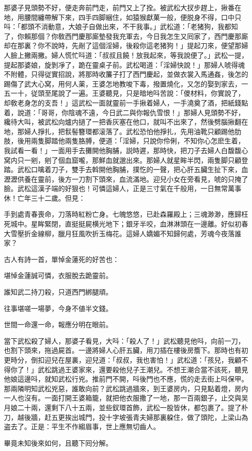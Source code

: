 那婆子見頭勢不好，便走奔前門走，前門又上了拴。被武松大扠步趕上，揪番在地，用腰間纏帶解下來，四手四脚綑住，如猿猴獻菓一般，便脱身不得，口中只呌：「都頭不消動意，大娘子自做出來，不干我事。」武松道：「老猪狗，我都知了，你賴那個？你敎西門慶那廝墊發我充軍去，今日我怎生又囘家了，西門慶那廝却在那裏？你不說時，先剮了這個淫婦，後殺你這老猪狗！」提起刀來，便望那婦人臉上撇兩撇。婦人慌忙呌道：「叔叔且饒！放我起來，等我說便了。」武松一提，提起那婆娘，旋剝凈了，跪在靈桌子前。武松喝道：「淫婦快說！」那婦人唬得魂不附體，只得従實招說，將那時收簾子打了西門慶起，並做衣裳入馬通姦，後怎的踢傷了武大心窝，用何人薬，王婆怎地教唆下毒，撥置燒化，又怎的娶到家去，一五一十，従頭至尾說了一遍。王婆聽見，只是暗地呌苦說：「儍材料，你實說了，却敎老身怎的支吾！」這武松一面就靈前一手揪着婦人，一手澆奠了酒，把紙錢點着，說道：「哥哥，你陰魂不遠，今日武二與你報仇雪恨！」那婦人見頭勢不好，纔待大叫，被武松向爐内撾了一把香灰塞在他口，就叫不出來了，然後劈腦揪翻在地，那婦人掙扎，把䯼髻簪環都滚落了。武松恐怕他掙扎，先用油靴只顧踢他肋肢，後用兩隻脚踏他兩隻胳膊，便道：「淫婦，只說你伶俐，不知你心怎麽生着，我試看一看！」一面用手去攤開他胸脯，説時遲，那時快，把刀子去婦人白馥馥心窝内只一剜，剜了個血窟嚨，那鮮血就邈出來。那婦人就星眸半閃，兩隻脚只顧登踏。武松口噙着刀子，雙手去斡開他胸脯，撲忔的一聲，把心肝五臟生扯下來，血瀝瀝供養在靈前，後方一刀割下頭來，血流滿地。迎兒小女在旁看見，唬的只掩了臉。武松這漢子端的好狠也！可憐這婦人，正是三寸氣在千般用，一日無常萬事休！亡年三十二歲。但見：

\begin{myquote}
手到處青春喪命，刀落時紅粉亡身。七魄悠悠，已赴森羅殿上；三魂渺渺，應歸枉死城中。星眸緊閉，直挺挺屍横光地下；銀牙半咬，血淋淋頭在一邊離。好似初春大雪壓折金線柳，臘月狂風吹折玉梅花。這婦人嬌媚不知歸何處，芳魂今夜落誰家？
\end{myquote}

古人有詩一首，單悼金蓮死的好苦也：

\begin{myquote}
堪悼金蓮誠可憐，衣服脫去跪靈前。

誰知武二持刀殺，只道西門綁腿頑。

往事堪嗟一場夢，今身不値半文錢。

世間一命還一命，報應分明在眼前。
\end{myquote}

當下武松殺了婦人，那婆子看見，大呌：「殺人了！」武松聽見他呌，向前一刀，也割下頭來，拖過屍首。一邊將婦人心肝五臟，用刀插在樓後房簷下。那時也有初更時分，倒扣迎兒在屋裏，迎兒道：「叔叔，我也害怕！」武松道：「孩兒，我顧不得你了！」武松跳過王婆家來，還要殺他兒子王潮兒。不想王潮合當不該死，聽見他娘這邊呌，就知武松行兇。推前門不開，呌後門也不應，慌的走去街上呌保甲。那兩隣明知武松兇惡，誰敢向前？武松跳過牆來，到王婆房内，只見點着燈，房内一人也沒有。一面打開王婆箱籠，就把他衣服撒了一地，那一百兩銀子，止交與吴月娘二十兩，還剩下八十五兩，並些釵環首飾，武松一股皆休，都包裹了。提了朴刀，越後牆，赶五更挨出城門，投十字坡張青夫婦那裏躱住，做了頭陀，上梁山為盗去了。正是：平生不作縐眉事，世上應無切齒人。

畢竟未知後來如何，且聽下囘分解。

